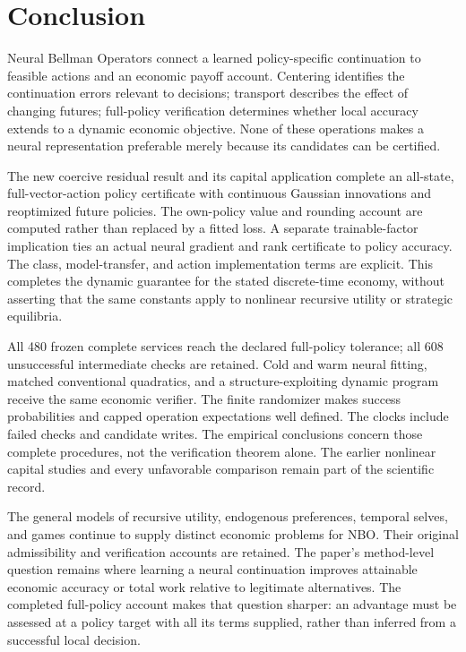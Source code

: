 \section{Conclusion}\label{sec:conclusion}
Neural Bellman Operators connect a learned policy-specific continuation to
feasible actions and an economic payoff account. Centering identifies the
continuation errors relevant to decisions; transport describes the effect
of changing futures; full-policy verification determines whether local
accuracy extends to a dynamic economic objective. None of these operations
makes a neural representation preferable merely because its candidates
can be certified.

The new coercive residual result and its capital application complete an
all-state, full-vector-action policy certificate with continuous Gaussian
innovations and reoptimized future policies. The own-policy value and
rounding account are computed rather than replaced by a fitted loss. A
separate trainable-factor implication ties an actual neural gradient and
rank certificate to policy accuracy. The class, model-transfer, and action
implementation terms are explicit. This completes the dynamic guarantee
for the stated discrete-time economy, without asserting that the same
constants apply to nonlinear recursive utility or strategic equilibria.

All 480 frozen complete services reach the declared full-policy tolerance;
all 608 unsuccessful intermediate checks are retained. Cold and warm neural
fitting, matched conventional quadratics, and a structure-exploiting dynamic
program receive the same economic verifier. The finite randomizer makes
success probabilities and capped operation expectations well defined. The
clocks include failed checks and candidate writes. The empirical conclusions
concern those complete procedures, not the verification theorem alone.
The earlier nonlinear capital studies and every unfavorable comparison
remain part of the scientific record.

The general models of recursive utility, endogenous preferences, temporal
selves, and games continue to supply distinct economic problems for NBO.
Their original admissibility and verification accounts are retained. The
paper's method-level question remains where learning a neural continuation
improves attainable economic accuracy or total work relative to legitimate
alternatives. The completed full-policy account makes that question
sharper: an advantage must be assessed at a policy target with all its
terms supplied, rather than inferred from a successful local decision.
